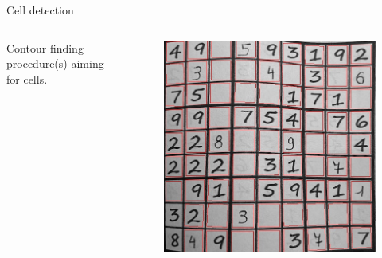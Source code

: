 \documentclass[12pt, dvipsnames]{beamer}
\begin{document}
\begin{frame}{Cell detection}
    \begin{columns}
        Contour finding procedure(s) aiming for cells.
        \begin{figure}
            \centering
            \includegraphics[width=1\textwidth]{resources/sudoku/sudoku_0025_05.jpg}
        \end{figure}
    \end{columns}
\end{frame}
\end{document}

